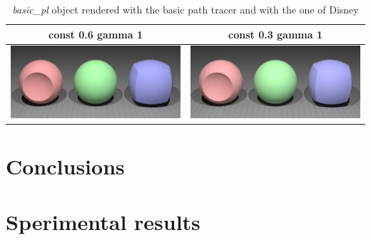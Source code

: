 \documentclass[11pt]{article}
\begin{document}
\begin{table}[ht]
  \centering
  \begin{tabular}{ | c | c | }
    \hline
    const 0.6 gamma 1 & const 0.3 gamma 1 \\ \hline
    \begin{minipage}{.3\textwidth}
      \includegraphics[scale=0.1]{img/obj/basic_pl/basic_pl_disney_dc03_dg1.jpg}
    \end{minipage}
    &
    \begin{minipage}{.3\textwidth}
      \includegraphics[scale=0.1]{img/obj/basic_pl/basic_pl_disney_dg1.jpg}
    \end{minipage}
    \\ \hline
  \end{tabular}
  \caption{\textit{basic\_pl} object rendered with the basic path tracer and with the one of Disney}\label{tbl:myLboro}
\end{table}



\section{Conclusions}
\section{Sperimental results}
\end{document}
